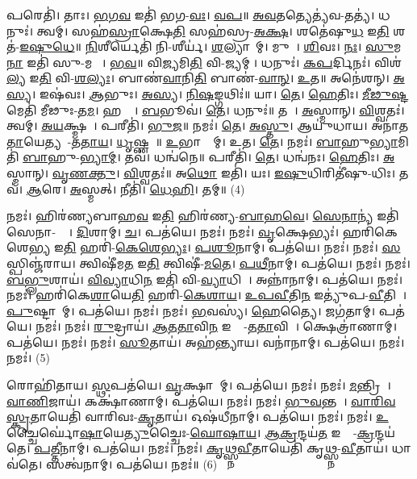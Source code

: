 𑌪𑌰𑍇𑌤𑌿॑। 𑌤𑌾𑌃। \ul{𑌭}\ul{𑌗}\ul{𑌵} 𑌇𑌤𑌿॑ 𑌭𑌗-\ul{𑌵𑌃}। \ul{𑌵}\ul{𑌪}॥ 
\ul{𑌅}\ul{𑌵}𑌤𑌤𑍍𑌯𑍇𑌤𑍍𑌯॑𑌵-𑌤𑌤𑍍𑌯॑। 𑌧𑌨𑍁𑌃॑। 𑌤𑍍𑌵𑌮𑍍। 𑌸𑌹॑\ul{𑌸𑍍𑌰𑌾}𑌕𑍍𑌷𑍇\ul{𑌤𑌿} 𑌸𑌹॑𑌸𑍍𑌰-\ul{𑌅}\ul{𑌕𑍍𑌷}। 𑌶𑌤𑍇॑𑌷𑍁\ul{𑌧} 𑌇\ul{𑌤𑌿} 𑌶𑌤॑-\ul{𑌇}\ul{𑌷𑍁}\ul{𑌧𑍇}॥ 
\ul{𑌨𑌿}𑌶𑍀𑌰𑍍𑌯𑍇𑌤𑌿॑ 𑌨𑌿-𑌶𑍀𑌰𑍍𑌯॑। \ul{𑌶}𑌲𑍍𑌯𑌾𑌨𑌾᳚𑌮𑍍। 𑌮𑍁𑌖𑌾᳚। \ul{𑌶𑌿}𑌵𑌃। \ul{𑌨𑌃}। \ul{𑌸𑍁}𑌮\ul{𑌨𑌾} 𑌇𑌤𑌿॑ 𑌸𑍁-𑌮𑌨𑌾𑌃᳚। \ul{𑌭}\ul{𑌵}॥ 
𑌵𑌿\ul{𑌜𑍍𑌯}𑌮𑌿\ul{𑌤𑌿} 𑌵𑌿-\ul{𑌜𑍍𑌯}𑌮𑍍। 𑌧𑌨𑍁𑌃॑। \ul{𑌕}\ul{𑌪}𑌰𑍍𑌦𑌿𑌨𑌃॑। 𑌵𑌿𑌶॑\ul{𑌲𑍍𑌯} 𑌇\ul{𑌤𑌿} 𑌵𑌿-\ul{𑌶}\ul{𑌲𑍍𑌯𑌃}। 𑌬𑌾𑌣॑\ul{𑌵𑌾}𑌨𑌿\ul{𑌤𑌿} 𑌬𑌾𑌣॑-\ul{𑌵𑌾}\ul{𑌨𑍍}। \ul{𑌉}𑌤॥ 
𑌅𑌨𑍇॑𑌶𑌨𑍍। \ul{𑌅}\ul{𑌸𑍍𑌯}। 𑌇𑌷॑𑌵𑌃। \ul{𑌆}𑌭𑍁𑌃। \ul{𑌅}\ul{𑌸𑍍𑌯}। \ul{𑌨𑌿}\ul{𑌷}𑌙𑍍𑌗𑌥𑌿𑌃॑॥ 
𑌯𑌾। \ul{𑌤𑍇}। \ul{𑌹𑍇}𑌤𑌿𑌃। \ul{𑌮𑍀}\ul{𑌢𑍁}\ul{𑌷𑍍𑌟}𑌮𑍇𑌤𑌿॑ 𑌮𑍀𑌢𑍁𑌃-\ul{𑌤}\ul{𑌮}। 𑌹𑌸𑍍𑌤𑍇᳚। \ul{𑌬}𑌭𑍂𑌵॑। \ul{𑌤𑍇}। 𑌧𑌨𑍁𑌃॑॥ 
𑌤𑌯𑌾᳚। \ul{𑌅}𑌸𑍍𑌮𑌾𑌨𑍍। \ul{𑌵𑌿}𑌶𑍍𑌵𑌤𑌃॑। 𑌤𑍍𑌵𑌮𑍍। \ul{𑌅}\ul{𑌯}𑌕𑍍𑌷𑍍𑌮𑌯𑌾᳚। 𑌪𑌰𑍀𑌤𑌿॑। \ul{𑌭𑍁}\ul{𑌜}॥ 
𑌨𑌮𑌃॑। \ul{𑌤𑍇}। \ul{𑌅}\ul{𑌸𑍍𑌤𑍁}। 𑌆𑌯𑍁॑𑌧𑌾𑌯। 𑌅𑌨𑌾॑𑌤\ul{𑌤𑌾}𑌯𑍇𑌤𑍍𑌯𑌨𑌾᳚-\ul{𑌤}\ul{𑌤𑌾}\ul{𑌯}। \ul{𑌧𑍃}𑌷𑍍𑌣𑌵𑍇᳚॥ 
\ul{𑌉}𑌭𑌾𑌭𑍍𑌯𑌾᳚𑌮𑍍। 𑌉𑌤। \ul{𑌤𑍇}। 𑌨𑌮𑌃॑। \ul{𑌬𑌾}𑌹𑍁\ul{𑌭𑍍𑌯𑌾}𑌮𑌿𑌤𑌿॑ \ul{𑌬𑌾}𑌹𑍁-\ul{𑌭𑍍𑌯𑌾}\ul{𑌮𑍍}। 𑌤𑌵॑। 𑌧𑌨𑍍𑌵॑𑌨𑍇॥ 
𑌪𑌰𑍀𑌤𑌿॑। \ul{𑌤𑍇}। 𑌧𑌨𑍍𑌵॑𑌨𑌃। \ul{𑌹𑍇}𑌤𑌿𑌃। \ul{𑌅}𑌸𑍍𑌮𑌾𑌨𑍍। \ul{𑌵𑍃}\ul{𑌣}\ul{𑌕𑍍𑌤𑍁}। \ul{𑌵𑌿}𑌶𑍍𑌵𑌤𑌃॑॥
 𑌅\ul{𑌥𑍋} 𑌇𑌤𑌿॑। 𑌯𑌃। \ul{𑌇}\ul{𑌷𑍁}𑌧𑌿𑌰𑌿𑌤𑍀॑𑌷𑍁-𑌧𑌿𑌃। 𑌤𑌵॑। \ul{𑌆}𑌰𑍇। \ul{𑌅}𑌸𑍍𑌮𑌤𑍍। 𑌨𑍀𑌤𑌿॑। \ul{𑌧𑍇}\ul{𑌹𑌿}। 𑌤𑌮𑍍॥ (4)


𑌨𑌮𑌃॑। 𑌹𑌿𑌰॑𑌣𑍍𑌯𑌬𑌾𑌹\ul{𑌵} 𑌇\ul{𑌤𑌿} 𑌹𑌿𑌰॑𑌣𑍍𑌯-\ul{𑌬𑌾}\ul{𑌹}\ul{𑌵𑍇}। \ul{𑌸𑍇}\ul{𑌨𑌾}𑌨𑍍𑌯॑ 𑌇𑌤𑌿॑ 𑌸𑍇𑌨𑌾-𑌨𑍍𑌯𑍇᳚। \ul{𑌦𑌿}𑌶𑌾𑌮𑍍। \ul{𑌚}। 𑌪𑌤॑𑌯𑍇। 𑌨𑌮𑌃॑। 
𑌨𑌮𑌃॑। \ul{𑌵𑍃}𑌕𑍍𑌷𑍇𑌭𑍍𑌯𑌃॑। 𑌹𑌰𑌿॑𑌕𑍇𑌶𑍇\ul{𑌭𑍍𑌯} 𑌇\ul{𑌤𑌿} 𑌹𑌰𑌿॑-\ul{𑌕𑍇}\ul{𑌶𑍇}\ul{𑌭𑍍𑌯𑌃}। \ul{𑌪}\ul{𑌶𑍂}𑌨𑌾𑌮𑍍। 𑌪𑌤॑𑌯𑍇। 𑌨𑌮𑌃॑। 
𑌨𑌮𑌃॑। \ul{𑌸}𑌸𑍍𑌪𑌿𑌞𑍍𑌜॑𑌰𑌾𑌯। 𑌤𑍍𑌵𑌿𑌷𑍀॑𑌮\ul{𑌤} 𑌇\ul{𑌤𑌿} 𑌤𑍍𑌵𑌿𑌷𑍀॑-\ul{𑌮}\ul{𑌤𑍇}। \ul{𑌪}\ul{𑌥𑍀}𑌨𑌾𑌮𑍍। 𑌪𑌤॑𑌯𑍇। 𑌨𑌮𑌃॑। 
𑌨𑌮𑌃॑। \ul{𑌬}\ul{𑌭𑍍𑌲𑍁}𑌶𑌾𑌯॑। \ul{𑌵𑌿}\ul{𑌵𑍍𑌯𑌾}𑌧𑌿\ul{𑌨} 𑌇𑌤𑌿॑ 𑌵𑌿-\ul{𑌵𑍍𑌯𑌾}𑌧𑌿𑌨𑍇᳚। 𑌅𑌨𑍍𑌨𑌾॑𑌨𑌾𑌮𑍍। 𑌪𑌤॑𑌯𑍇। 𑌨𑌮𑌃॑। 
𑌨𑌮𑌃॑। 𑌹𑌰𑌿॑𑌕𑍇\ul{𑌶𑌾}𑌯𑍇\ul{𑌤𑌿} 𑌹𑌰𑌿॑-\ul{𑌕𑍇}\ul{𑌶𑌾}\ul{𑌯}। \ul{𑌉}\ul{𑌪}\ul{𑌵𑍀}𑌤𑌿\ul{𑌨} 𑌇𑌤𑍍𑌯𑍁॑𑌪-\ul{𑌵𑍀}𑌤𑌿𑌨𑍇᳚। \ul{𑌪𑍁}𑌷𑍍𑌟𑌾𑌨𑌾᳚𑌮𑍍। 𑌪𑌤॑𑌯𑍇। 𑌨𑌮𑌃॑। 
𑌨𑌮𑌃॑। \ul{𑌭}𑌵𑌸𑍍𑌯॑। \ul{𑌹𑍇}𑌤𑍍𑌯𑍈। 𑌜𑌗॑𑌤𑌾𑌮𑍍। 𑌪𑌤॑𑌯𑍇। 𑌨𑌮𑌃॑। 
𑌨𑌮𑌃॑। \ul{𑌰𑍁}𑌦𑍍𑌰𑌾𑌯॑। \ul{𑌆}\ul{𑌤}\ul{𑌤𑌾}𑌵𑌿\ul{𑌨} 𑌇𑌤𑍍𑌯𑌾᳚-\ul{𑌤}\ul{𑌤𑌾}𑌵𑌿𑌨𑍇᳚। 𑌕𑍍𑌷𑍇𑌤𑍍𑌰𑌾॑𑌣𑌾𑌮𑍍। 𑌪𑌤॑𑌯𑍇। 𑌨𑌮𑌃॑। 
𑌨𑌮𑌃॑। \ul{𑌸𑍂}𑌤𑌾𑌯॑। 𑌅𑌹॑𑌨𑍍𑌤𑍍𑌯𑌾𑌯। 𑌵𑌨𑌾॑𑌨𑌾𑌮𑍍। 𑌪𑌤॑𑌯𑍇। 𑌨𑌮𑌃॑। 
𑌨𑌮𑌃॑। (5)


𑌰𑍋𑌹𑌿॑𑌤𑌾𑌯। \ul{𑌸𑍍𑌥}𑌪𑌤॑𑌯𑍇। \ul{𑌵𑍃}𑌕𑍍𑌷𑌾𑌣𑌾᳚𑌮𑍍। 𑌪𑌤॑𑌯𑍇। 𑌨𑌮𑌃॑। 
𑌨𑌮𑌃॑। \ul{𑌮}𑌨𑍍𑌤𑍍𑌰𑌿𑌣𑍇᳚। \ul{𑌵𑌾}\ul{𑌣𑌿}𑌜𑌾𑌯॑। 𑌕𑌕𑍍𑌷𑌾॑𑌣𑌾𑌮𑍍। 𑌪𑌤॑𑌯𑍇। 𑌨𑌮𑌃॑। 
𑌨𑌮𑌃॑। \ul{𑌭𑍁}\ul{𑌵}𑌨𑍍𑌤𑌯𑍇᳚। \ul{𑌵𑌾}\ul{𑌰𑌿}\ul{𑌵}\ul{𑌸𑍍𑌕𑍃}𑌤𑌾𑌯𑍇𑌤𑌿॑ 𑌵𑌾𑌰𑌿𑌵𑌃-\ul{𑌕𑍃}𑌤𑌾𑌯॑। 𑌓𑌷॑𑌧𑍀𑌨𑌾𑌮𑍍। 𑌪𑌤॑𑌯𑍇। 𑌨𑌮𑌃॑। 
𑌨𑌮𑌃॑। \ul{𑌉}𑌚𑍍𑌚𑍈𑌰𑍍𑌘𑍋॑\ul{𑌷𑌾}𑌯𑍇\ul{𑌤𑍍𑌯𑍁}𑌚𑍍𑌚𑍈𑌃-\ul{𑌘𑍋}\ul{𑌷𑌾}\ul{𑌯}। \ul{𑌆}\ul{𑌕𑍍𑌰}𑌨𑍍𑌦𑌯॑\ul{𑌤} 𑌇𑌤𑍍𑌯𑌾᳚-\ul{𑌕𑍍𑌰}𑌨𑍍𑌦𑌯॑𑌤𑍇। \ul{𑌪}\ul{𑌤𑍍𑌤𑍀}𑌨𑌾𑌮𑍍। 𑌪𑌤॑𑌯𑍇। 𑌨𑌮𑌃॑। 
𑌨𑌮𑌃॑। \ul{𑌕𑍃}\ul{𑌥𑍍𑌸𑍍𑌨}\ul{𑌵𑍀}𑌤𑌾𑌯𑍇𑌤𑌿॑ 𑌕𑍃𑌥𑍍𑌸𑍍𑌨-\ul{𑌵𑍀}𑌤𑌾𑌯॑। 𑌧𑌾𑌵॑𑌤𑍇। 𑌸𑌤𑍍𑌵॑𑌨𑌾𑌮𑍍। 𑌪𑌤॑𑌯𑍇। 𑌨𑌮𑌃॑॥ (6)


